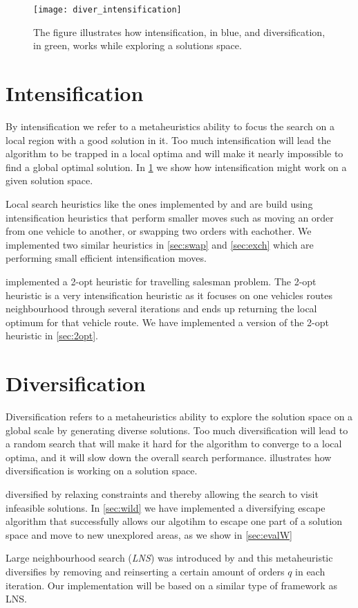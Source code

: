\documentclass[../main.tex]{subfiles}
\begin{document}
\begin{figure}
    \centering
    \texttt{[image: diver\_intensification]}
    \caption{The figure illustrates how intensification, in blue, and diversification, in green, works while exploring a solutions space.}
    \label{fig:sification}
\end{figure}

\section{Intensification}
\label{sec:intens}
By intensification we refer to a metaheuristics ability to focus the search on a local region with a good solution in it. 
Too much intensification will lead the algorithm to be trapped in a local optima and will make it nearly impossible to find a global optimal solution. 
In \cref{fig:sification} we show how intensification might work on a given solution space. \par

Local search heuristics like the ones implemented by \cite{nanry00} and \cite{li03} are build using intensification heuristics that perform smaller moves such as moving an order from one vehicle to another, or swapping two orders with eachother. 
We implemented two similar heuristics in \cref{sec:swap} and \cref{sec:exch} which are performing small efficient intensification moves. \par
\cite{lin65} implemented a 2-opt heuristic for travelling salesman problem. The 2-opt heuristic is a very intensification heuristic as it focuses on one vehicles routes neighbourhood through several iterations and ends up returning the local optimum for that vehicle route. We have implemented a version of the 2-opt heuristic in \cref{sec:2opt}.

\section{Diversification}
\label{sec:divers}
Diversification refers to a metaheuristics ability to explore the solution space on a global scale by generating diverse solutions. 
Too much diversification will lead to a random search that will make it hard for the algorithm to converge to a local optima, and it will slow down the overall search performance. 
 illustrates how diversification is working on a solution space. \par

\cite{cordeau01} diversified by relaxing constraints and thereby allowing the search to visit infeasible solutions. In \cref{sec:wild} we have implemented a diversifying escape algorithm that successfully allows our algotihm to escape one part of a solution space and move to new unexplored areas, as we show in \cref{sec:evalW} \par
Large neighbourhood search (\textit{LNS}) was introduced by \cite{shaw97} and this metaheuristic diversifies by removing and reinserting a certain amount of orders $q$ in each iteration. 
Our implementation will be based on a similar type of framework as LNS.
\end{document}

